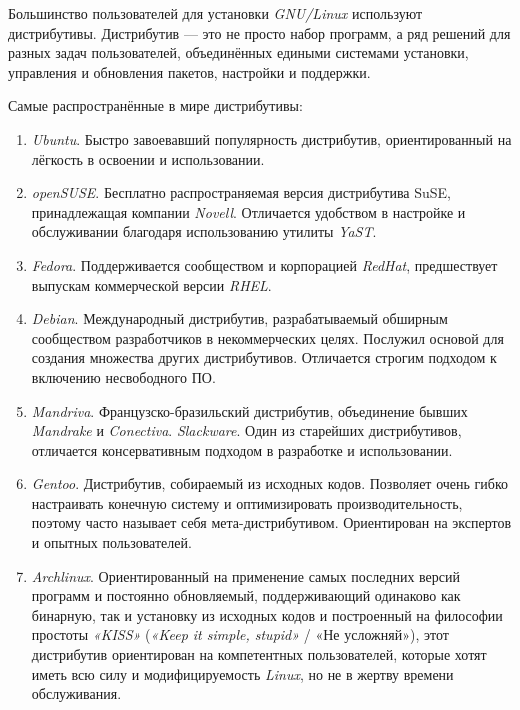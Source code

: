 Большинство пользователей для установки \textit{GNU/Linux} используют дистрибутивы. Дистрибутив — это не просто набор программ, а ряд решений для разных задач пользователей, объединённых едиными системами установки, управления и обновления пакетов, настройки и поддержки.~\cite{linuxOffDoc}

Самые распространённые в мире дистрибутивы:
\begin{enumerate}

\item \textit{Ubuntu}. Быстро завоевавший популярность дистрибутив, ориентированный на лёгкость в освоении и использовании.

\item \textit{openSUSE}. Бесплатно распространяемая версия дистрибутива SuSE, принадлежащая компании \textit{Novell}. Отличается удобством в настройке и обслуживании благодаря использованию утилиты \textit{YaST}.
\item \textit{Fedora}. Поддерживается сообществом и корпорацией \textit{RedHat}, предшествует выпускам коммерческой версии \textit{RHEL}.

\item \textit{Debian}. Международный дистрибутив, разрабатываемый обширным сообществом разработчиков в некоммерческих целях. Послужил основой для создания множества других дистрибутивов. Отличается строгим подходом к включению несвободного ПО.
\item \textit{Mandriva}. Французско-бразильский дистрибутив, объединение бывших \textit{Mandrake} и \textit{Conectiva}.
\textit{Slackware}. Один из старейших дистрибутивов, отличается консервативным подходом в разработке и использовании.

\item \textit{Gentoo}. Дистрибутив, собираемый из исходных кодов. Позволяет очень гибко настраивать конечную систему и оптимизировать производительность, поэтому часто называет себя мета-дистрибутивом. Ориентирован на экспертов и опытных пользователей.

\item \textit{Archlinux}. Ориентированный на применение самых последних версий программ и постоянно обновляемый, поддерживающий одинаково как бинарную, так и установку из исходных кодов и построенный на философии простоты \textit{«KISS»} (\textit{«Keep it simple, stupid»} / «Не усложняй»), этот дистрибутив ориентирован на компетентных пользователей, которые хотят иметь всю силу и модифицируемость \textit{Linux}, но не в жертву времени обслуживания.
\end{enumerate}

